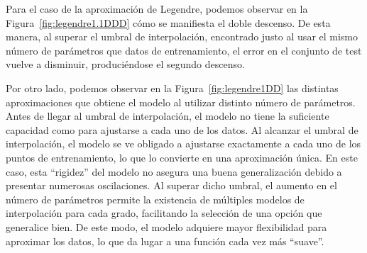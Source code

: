Para el caso de la aproximación de Legendre, podemos observar en la Figura~\ref{fig:legendre1.1DDD} cómo se manifiesta el doble descenso. De esta manera, al superar el umbral de interpolación, encontrado justo al usar el mismo número de parámetros que datos de entrenamiento, el error en el conjunto de test vuelve a disminuir, produciéndose el segundo descenso.

Por otro lado, podemos observar en la Figura~\ref{fig:legendre1DD} las distintas aproximaciones que obtiene el modelo al utilizar distinto número de parámetros. Antes de llegar al umbral de interpolación, el modelo no tiene la suficiente capacidad como para ajustarse a cada uno de los datos. Al alcanzar el umbral de interpolación, el modelo se ve obligado a ajustarse exactamente a cada uno de los puntos de entrenamiento, lo que lo convierte en una aproximación única. En este caso, esta ``rigidez'' del modelo no asegura una buena generalización debido a presentar numerosas oscilaciones. Al superar dicho umbral, el aumento en el número de parámetros permite la existencia de múltiples modelos de interpolación para cada grado, facilitando la selección de una opción que generalice bien. De este modo, el modelo adquiere mayor flexibilidad para aproximar los datos, lo que da lugar a una función cada vez más ``suave''.

